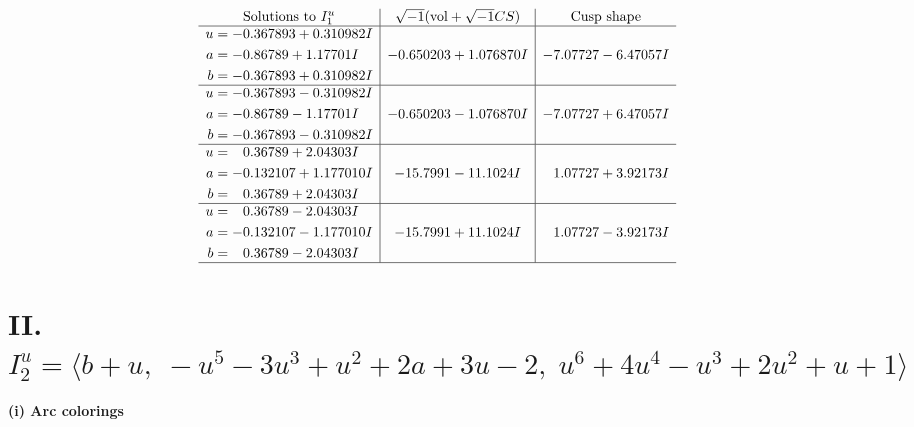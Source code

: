 \documentclass[1p]{elsarticle_modified}
\theoremstyle{definition}
\newcommand{\I}{\sqrt{-1}}
\begin{document}
$$\begin{array}{c|c|c}  
\text{Solutions to }I^u_{1}& \I (\text{vol} + \sqrt{-1}CS) & \text{Cusp shape}\\
 \hline 
\begin{aligned}
u &= -0.367893 + 0.310982 I \\
a &= -0.86789 + 1.17701 I \\
b &= -0.367893 + 0.310982 I\end{aligned}
 & -0.650203 + 1.076870 I & -7.07727 - 6.47057 I \\ \hline\begin{aligned}
u &= -0.367893 - 0.310982 I \\
a &= -0.86789 - 1.17701 I \\
b &= -0.367893 - 0.310982 I\end{aligned}
 & -0.650203 - 1.076870 I & -7.07727 + 6.47057 I \\ \hline\begin{aligned}
u &= \phantom{-}0.36789 + 2.04303 I \\
a &= -0.132107 + 1.177010 I \\
b &= \phantom{-}0.36789 + 2.04303 I\end{aligned}
 & -15.7991 - 11.1024 I & \phantom{-}1.07727 + 3.92173 I \\ \hline\begin{aligned}
u &= \phantom{-}0.36789 - 2.04303 I \\
a &= -0.132107 - 1.177010 I \\
b &= \phantom{-}0.36789 - 2.04303 I\end{aligned}
 & -15.7991 + 11.1024 I & \phantom{-}1.07727 - 3.92173 I\\
 \hline 
 \end{array}$$\newpage\newpage\renewcommand{\arraystretch}{1}
\centering \section*{II. $I^u_{2}= \langle b+u,\;- u^5-3 u^3+u^2+2 a+3 u-2,\;u^6+4 u^4- u^3+2 u^2+u+1 \rangle$}
\flushleft \textbf{(i) Arc colorings}\\
\end{document}
